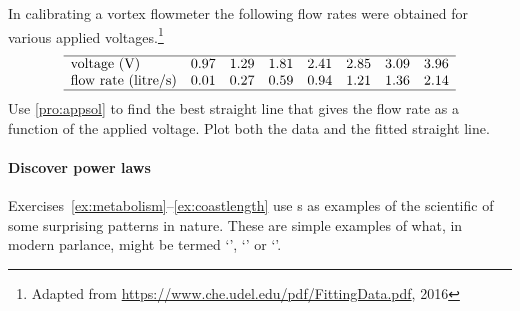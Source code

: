 \begin{exercise} \label{ex:} 
In calibrating a vortex flowmeter the following flow rates were obtained for various applied voltages.\footnote{Adapted from \url{https://www.che.udel.edu/pdf/FittingData.pdf}, 2016}
\setbox\ajrqrbox\hbox{}%
\marginpar{\usebox{\ajrqrbox\\[2ex]}}%
\begin{equation*}
\begin{array}{lrrrrrrrr}\hline
\text{voltage (V)}&0.97&1.29&1.81&2.41&2.85&3.09&3.96\\
\text{flow rate (litre/s)}&0.01&0.27&0.59&0.94&1.21&1.36&2.14\\\hline
\end{array}
\end{equation*}
Use \autoref{pro:appsol} to find the best straight line that gives the flow rate as a function of the applied voltage.
Plot both the data and the fitted straight line.
\end{exercise}





\paragraph{Discover power laws}
Exercises~\ref{ex:metabolism}--\ref{ex:coastlength} use s as examples of the scientific  of some surprising patterns in nature.  
These are simple examples of what, in modern parlance, might be termed `', `' or `'.


